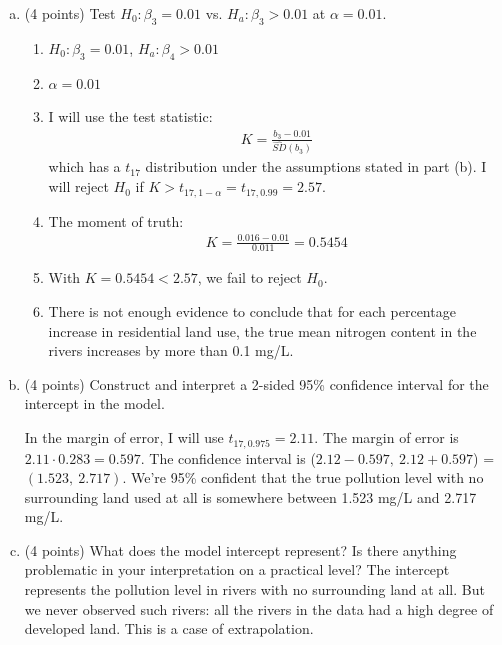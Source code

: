 \documentclass{article}\usepackage{graphicx, color}
\providecommand{\wh}[1]{\widehat{#1}}
\numberwithin{equation}{section}
\begin{document}
\begin{flushleft}
\begin{enumerate}[1. ]
\begin{enumerate}[a. ]
\item (4 points) Test $H_0: \beta_3 = 0.01$ vs. $H_a: \beta_3 > 0.01$ at $\alpha = 0.01$.


{\color{red}
\begin{enumerate}[1. ]
\item $H_0: \beta_3 = 0.01$, $H_a: \beta_4 > 0.01$
\item $\alpha = 0.01$ 
\item I will use the test statistic:
\begin{align*}
K = \frac{b_3 - 0.01}{\wh{SD}(b_3)}
\end{align*}
which has a $t_{17}$ distribution under the assumptions stated in part (b). I will reject $H_0$ if $K > t_{17, 1 - \alpha} = t_{17, 0.99} = 2.57$. 
\item The moment of truth:
\begin{align*}
K = \frac{0.016 - 0.01}{0.011} = 0.5454
\end{align*}
\item With $K = 0.5454 < 2.57$, we fail to reject $H_0$.
\item There is not enough evidence to conclude that for each percentage increase in residential land use, the true mean nitrogen content in the rivers increases by more than 0.1 mg/L. 
\end{enumerate}
}

\item (4 points) Construct and interpret a 2-sided 95\% confidence interval for the intercept in the model.

{\color{red}
In the margin of error, I will use $t_{17, 0.975} = 2.11$. The margin of error is $2.11 \cdot 0.283 = 0.597$. The confidence interval is ($2.12 - 0.597, \ 2.12 + 0.597$) = $(1.523, \ 2.717)$. We're 95\% confident that the true pollution level with no surrounding land used at all is somewhere between 1.523 mg/L and 2.717 mg/L.

}

\item (4 points) What does the model intercept represent? Is there anything problematic in your interpretation on a practical level?
{\color{red}
The intercept represents the pollution level in rivers with no surrounding land at all. But we never observed such rivers: all the rivers in the data had a high degree of developed land. This is a case of extrapolation.
}


\end{enumerate}





\end{enumerate}
\end{flushleft}
\end{document}
